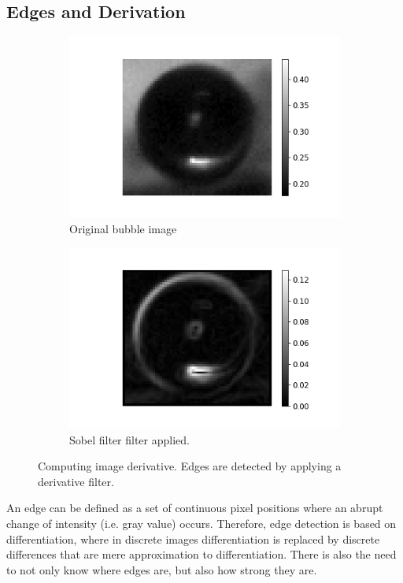 		\subsection{Edges and Derivation}
		\begin{figure}
			\centering
			\begin{subfigure}[t]{.4\linewidth}
				\includegraphics[scale=0.4]{images/green_one.png}
				\caption{Original bubble image}
			\end{subfigure}\hfill
			\begin{subfigure}[t]{.4\linewidth}
				\includegraphics[scale=0.4]{images/green_one_sobel.png}
				\caption{Sobel filter filter applied.}
			\end{subfigure}
			
			\caption{Computing image derivative. Edges are detected by applying a derivative filter.}
			\label{fig:sobel_demo}
		\end{figure}
		An edge can be defined as a set of continuous pixel positions where an abrupt change of intensity (i.e. gray value) occurs. Therefore, edge detection is based on differentiation, where in discrete images differentiation is replaced by discrete differences that are mere approximation to differentiation. There is also the need to not only know where edges are, but also how strong they are.
		
